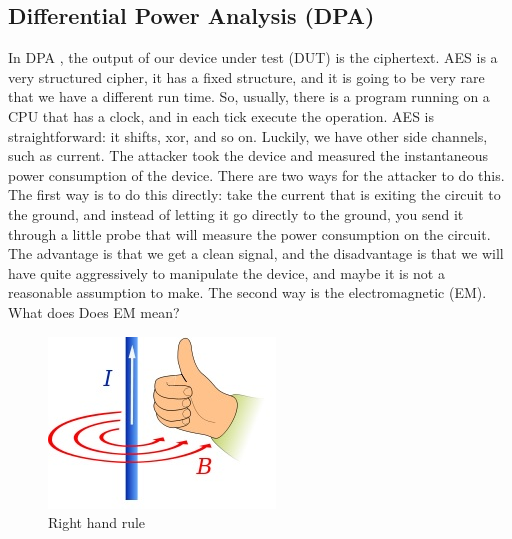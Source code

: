 \subsection{Differential Power Analysis (DPA)}\label{c8_prev_lectures_recap_dpa_sc:subsec}

In DPA \cite{kocher1999differential, kocher1998introduction}, the output of our device under test (DUT) is the ciphertext. AES is a
very structured cipher, it has a fixed structure, and it is going to be very rare
that we have a different run time. So, usually, there is a program running
on a CPU that has a clock, and in each tick execute the operation. AES is straightforward: it shifts, xor, and so on. Luckily, we have other side channels, such as
current. The attacker took the device and measured the instantaneous power
consumption of the device. There are two ways for the attacker to do this. The
first way is to do this directly: take the current that is exiting the circuit
to the ground, and instead of letting it go directly to the ground, you send it
through a little probe that will measure the power consumption on the circuit.
The advantage is that we get a clean signal, and the disadvantage is that we
will have quite aggressively to manipulate the device, and maybe it is not a
reasonable assumption to make. The second way is the electromagnetic (EM). What does
Does EM mean?

\begin{figure}[!ht]
    \centering
    \includegraphics{images/chapter8/right_hand_rule.jpeg}
    \caption{Right hand rule} \label{c8_right_hand_rule:fig}
\end{figure}

